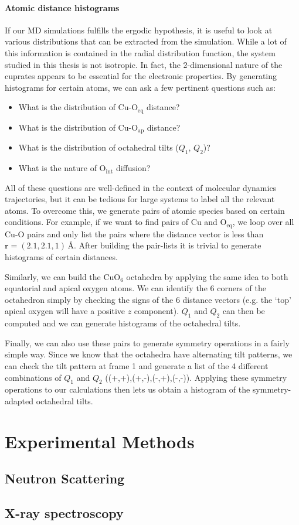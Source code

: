 \subsubsection{Atomic distance histograms}
If our MD simulations fulfills the ergodic hypothesis, it is useful to look at various distributions that can be extracted from the simulation. While a lot of this information is contained in the radial distribution function, the system studied in this thesis is not isotropic. In fact, the 2-dimensional nature of the cuprates appears to be essential for the electronic properties. By generating histograms for certain atoms, we can ask a few pertinent questions such as:
%
\begin{itemize}
	\item What is the distribution of Cu-O$_\text{eq}$ distance?
	\item What is the distribution of Cu-O$_\text{ap}$ distance?
	\item What is the distribution of octahedral tilts ($Q_1$, $Q_2$)?
	\item What is the nature of O$_\text{int}$ diffusion?
\end{itemize}
%
All of these questions are well-defined in the context of molecular dynamics trajectories, but it can be tedious for large systems to label all the relevant atoms. To overcome this, we generate pairs of atomic species based on certain conditions. For example, if we want to find pairs of Cu and O$_\text{eq}$, we loop over all Cu-O pairs and only list the pairs where the distance vector is less than $\bm{r} = (2.1, 2.1, 1)\,\si{\angstrom}$. After building the pair-lists it is trivial to generate histograms of certain distances.

Similarly, we can build the CuO$_6$ octahedra by applying the same idea to both equatorial and apical oxygen atoms. We can identify the 6 corners of the octahedron simply by checking the signs of the 6 distance vectors (e.g. the `top' apical oxygen will have a positive $z$ component). $Q_1$ and $Q_2$ can then be computed and we can generate histograms of the octahedral tilts.

Finally, we can also use these pairs to generate symmetry operations in a fairly simple way. Since we know that the octahedra have alternating tilt patterns, we can check the tilt pattern at frame 1 and generate a list of the 4 different combinations of $Q_1$ and $Q_2$ ((+,+),(+,-),(-,+),(-,-)). Applying these symmetry operations to our calculations then lets us obtain a histogram of the symmetry-adapted octahedral tilts.

\chapter{Experimental Methods}
\section{Neutron Scattering}
\section{X-ray spectroscopy}